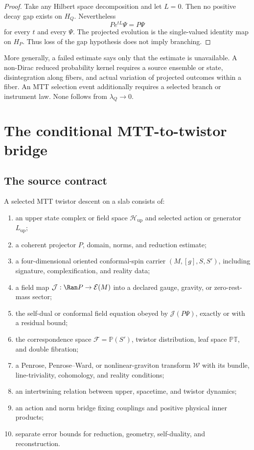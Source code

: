 \documentclass[11pt]{article}
\newcommand{\PT}{\mathbb{PT}}
\newcommand{\cF}{\mathcal{F}}
\newcommand{\cH}{\mathcal{H}}
\begin{document}
\begin{proof}
Take any Hilbert space decomposition and let \(L=0\). Then no positive
decay gap exists on \(H_Q\). Nevertheless
\[
Pe^{tL}\Psi=P\Psi
\]
for every \(t\) and every \(\Psi\). The projected evolution is the
single-valued identity map on \(H_P\). Thus loss of the gap hypothesis does
not imply branching.
\end{proof}

More generally, a failed estimate says only that the estimate is unavailable.
A non-Dirac reduced probability kernel requires a source ensemble or state,
disintegration along fibers, and actual variation of projected outcomes
within a fiber. An MTT selection event additionally requires a selected
branch or instrument law. None follows from \(\lambda_Q\to0\).

\section{The conditional MTT-to-twistor bridge}

\subsection{The source contract}

\begin{definition}
\label{def:contract}
A selected MTT twistor descent on a slab consists of:
\begin{enumerate}
\item an upper state complex or field space \(\cH_{\mathrm{up}}\) and selected
action or generator \(L_{\mathrm{up}}\);
\item a coherent projector \(P\), domain, norms, and reduction estimate;
\item a four-dimensional oriented conformal-spin carrier
\((M,[g],S,S')\), including signature, complexification, and reality data;
\item a field map
\(\mathcal J:\Ran P\to\mathcal E(M)\) into a declared gauge, gravity, or
zero-rest-mass sector;
\item the self-dual or conformal field equation obeyed by
\(\mathcal J(P\Psi)\), exactly or with a residual bound;
\item the correspondence space \(\cF=\mathbb P(S')\), twistor distribution,
leaf space \(\PT\), and double fibration;
\item a Penrose, Penrose--Ward, or nonlinear-graviton transform
\(\mathcal W\) with its bundle, line-triviality, cohomology, and reality
conditions;
\item an intertwining relation between upper, spacetime, and twistor
dynamics;
\item an action and norm bridge fixing couplings and positive physical
inner products;
\item separate error bounds for reduction, geometry, self-duality, and
reconstruction.
\end{enumerate}
\end{definition}
\end{document}
